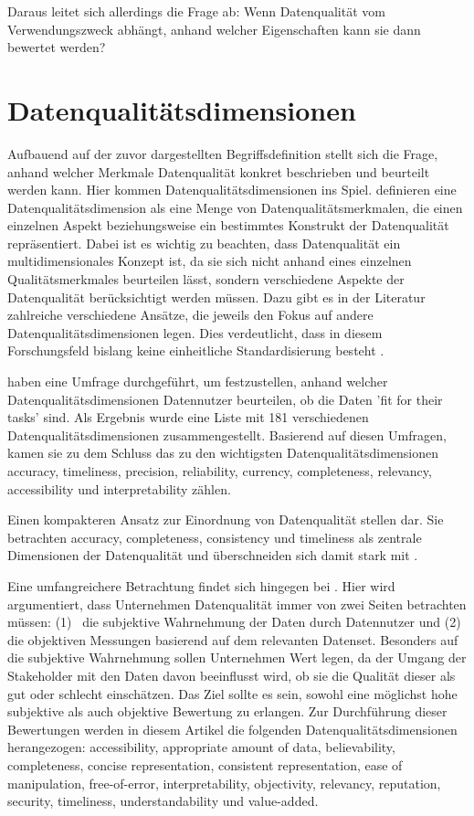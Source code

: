 \documentclass[../main.tex]{subfiles}
\begin{document}
Daraus leitet sich allerdings die Frage ab: Wenn Datenqualität vom Verwendungszweck abhängt, anhand welcher Eigenschaften kann sie dann bewertet werden?

\section{Datenqualitätsdimensionen}

Aufbauend auf der zuvor dargestellten Begriffsdefinition stellt sich die Frage, anhand welcher Merkmale Datenqualität konkret beschrieben und beurteilt werden kann. Hier kommen Datenqualitätsdimensionen ins Spiel. \textcite{wangAccuracyWhatData1996} definieren eine Datenqualitätsdimension als eine Menge von Datenqualitätsmerkmalen, die einen einzelnen Aspekt beziehungsweise ein bestimmtes Konstrukt der Datenqualität repräsentiert. Dabei ist es wichtig zu beachten, dass Datenqualität ein multidimensionales Konzept ist, da sie sich nicht anhand eines einzelnen Qualitätsmerkmales beurteilen lässt, sondern verschiedene Aspekte der Datenqualität berücksichtigt werden müssen. Dazu gibt es in der Literatur zahlreiche verschiedene Ansätze, die jeweils den Fokus auf andere Datenqualitätsdimensionen legen. Dies verdeutlicht, dass in diesem Forschungsfeld bislang keine einheitliche Standardisierung besteht \parencite{zotero-item-22}. 

\textcite{wangAccuracyWhatData1996} haben eine Umfrage durchgeführt, um festzustellen, anhand welcher Datenqualitätsdimensionen Datennutzer beurteilen, ob die Daten 'fit for their tasks' sind. Als Ergebnis wurde eine Liste mit 181 verschiedenen Datenqualitätsdimensionen zusammengestellt. Basierend auf diesen Umfragen, kamen sie zu dem Schluss das zu den wichtigsten Datenqualitätsdimensionen accuracy, timeliness, precision, reliability, currency, completeness, relevancy, accessibility und interpretability zählen.

Einen kompakteren Ansatz zur Einordnung von Datenqualität stellen \textcite{tayiExaminingDataQuality1998} dar. Sie betrachten accuracy, completeness, consistency und timeliness als zentrale Dimensionen der Datenqualität und überschneiden sich damit stark mit \textcite{wangAccuracyWhatData1996}.

Eine umfangreichere Betrachtung findet sich hingegen bei \textcite{pipinoDataQualityAssessment}. Hier wird argumentiert, dass Unternehmen Datenqualität immer von zwei Seiten betrachten müssen: (1)~ die subjektive Wahrnehmung der Daten durch Datennutzer und (2)~ die objektiven Messungen basierend auf dem relevanten Datenset. Besonders auf die subjektive Wahrnehmung sollen Unternehmen Wert legen, da der Umgang der Stakeholder mit den Daten davon beeinflusst wird, ob sie die Qualität dieser als gut oder schlecht einschätzen. Das Ziel sollte es sein, sowohl eine möglichst hohe subjektive als auch objektive Bewertung zu erlangen. Zur Durchführung dieser Bewertungen werden in diesem Artikel die folgenden Datenqualitätsdimensionen herangezogen: accessibility, appropriate amount of data, believability, completeness, concise representation, consistent representation, ease of manipulation, free-of-error, interpretability, objectivity, relevancy, reputation, security, timeliness, understandability und value-added.
\end{document}
